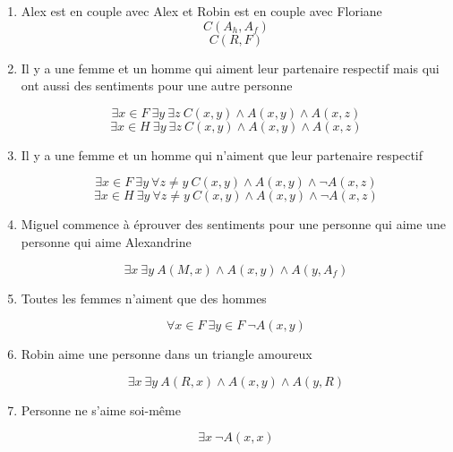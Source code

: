 \documentclass[12pt,a4paper,oneside]{article}
\begin{document}
		\begin{enumerate}
			\item Alex est en couple avec Alex et Robin est en couple avec Floriane
				$$C(A_{h}, A_{f})$$
				$$C(R, F)$$

			\item Il y a une femme et un homme qui aiment leur partenaire respectif mais qui ont aussi des sentiments pour une autre personne

				$$\exists x \in F\ \exists y\ \exists z\ C(x, y) \wedge A(x, y) \wedge A(x, z)$$
				$$\exists x \in H\ \exists y\ \exists z\ C(x, y) \wedge A(x, y) \wedge A(x, z)$$

			\item Il y a une femme et un homme qui n’aiment que leur partenaire respectif

				$$\exists x \in F\ \exists y\ \forall  z\neq y\ C(x, y) \wedge A(x, y) \wedge \neg A(x, z)$$
				$$\exists x \in H\ \exists y\ \forall z\neq y\ C(x, y) \wedge A(x, y) \wedge \neg A(x, z)$$

			\item Miguel commence à éprouver des sentiments pour une personne qui aime une personne qui aime Alexandrine

				$$\exists x\ \exists y\ A(M, x) \wedge A(x, y) \wedge A(y, A_{f})$$

			\item Toutes les femmes n’aiment que des hommes

				$$\forall x \in F\ \exists y \in F\ \neg A(x, y)$$

			\item Robin aime une personne dans un triangle amoureux

				$$\exists x\ \exists y\ A(R, x) \wedge A(x,y) \wedge A(y, R)$$

			\item Personne ne s’aime soi-même

				$$\exists x\ \neg A(x, x)$$

		\end{enumerate}
\end{document}
